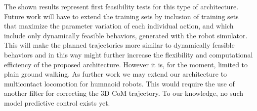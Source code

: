 The shown results represent first feasibility tests for this type of architecture. Future work will
have to extend the training sets by inclusion of training sets that maximize the parameter variation
of each individual action, and which include only dynamically feasible behaviors, generated with the
robot simulator. This will make the planned trajectories more similar to dynamically feasible
behaviors and in this way might further increase the flexibility and computational efficiency
of the proposed architecture.
However it is, for the moment, limited to plain ground walking.
As further work we may extend our architecture to multicontact locomotion for humnaoid robots.
This would require the use of another filter for correcting the 3D CoM trajectory.
To our knowledge, no such model predictive control exists yet.
